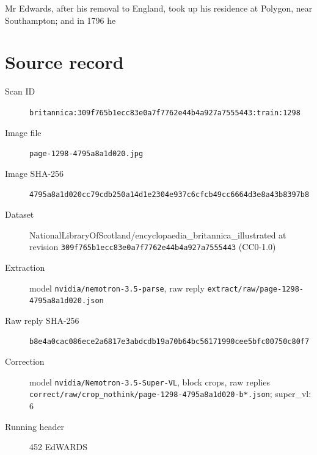 \documentclass{article}
\begin{document}
Mr Edwards, after his removal to England, took up his residence at Polygon, near Southampton; and in 1796 he


\section*{Source record}
\begin{description}
\item[Scan ID] \texttt{britannica:309f765b1ecc83e0a7f7762e44b4a927a7555443:train:1298}
\item[Image file] \texttt{page-1298-4795a8a1d020.jpg}
\item[Image SHA-256] \texttt{4795a8a1d020cc79cdb250a14d1e2304e937c6cfcb49cc6664d3e8a43b8397b8}
\item[Dataset] NationalLibraryOfScotland/encyclopaedia\_britannica\_illustrated at revision \texttt{309f765b1ecc83e0a7f7762e44b4a927a7555443} (CC0-1.0)
\item[Extraction] model \texttt{nvidia/nemotron-3.5-parse}, raw reply \texttt{extract/raw/page-1298-4795a8a1d020.json}
\item[Raw reply SHA-256] \texttt{b8e4a0cac086ece2a6817e3abdcdb19a70b64bc56171990cee5bfc00750c80f7}
\item[Correction] model \texttt{nvidia/Nemotron-3.5-Super-VL}, block crops, raw replies \texttt{correct/raw/crop\_nothink/page-1298-4795a8a1d020-b*.json}; super\_vl: 6
\item[Running header] 452 EdWARDS
\end{description}
\end{document}

